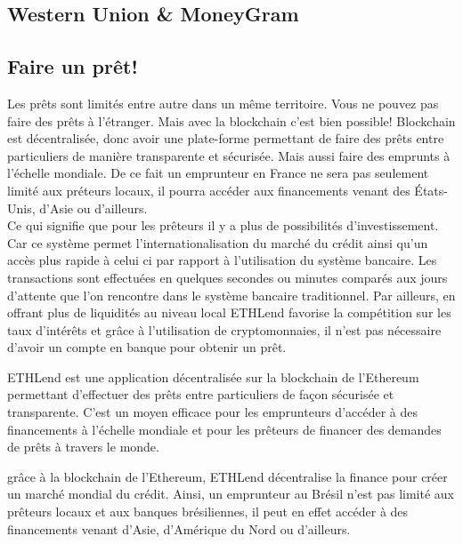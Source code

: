 \documentclass[12pt]{report}
\begin{document}

    \subsection{Western Union \& MoneyGram}


    \subsection{Faire un prêt! }
    
\hspace{1cm} Les prêts sont limités entre autre dans un même territoire. Vous ne pouvez pas faire des prêts à l'étranger. Mais avec la blockchain c'est bien possible! Blockchain  est décentralisée, donc avoir une plate-forme permettant de faire des prêts entre particuliers de manière transparente et sécurisée. Mais aussi faire des emprunts à l'échelle mondiale. De ce fait un emprunteur en France ne sera pas seulement limité aux préteurs locaux, il pourra accéder aux financements venant des États-Unis, d'Asie ou d'ailleurs. \\

\hspace{1cm} Ce qui signifie que pour les prêteurs il y a plus de possibilités d’investissement. Car ce système permet l’internationalisation du marché du crédit ainsi qu’un accès plus rapide à celui ci par rapport à l’utilisation du système bancaire. Les transactions sont effectuées en quelques secondes ou minutes comparés aux jours d’attente que l’on rencontre dans le système bancaire traditionnel.
Par ailleurs, en offrant plus de liquidités au niveau local ETHLend favorise la compétition sur les taux d’intérêts et grâce à l’utilisation de cryptomonnaies, il n’est pas nécessaire d’avoir un compte en banque pour obtenir un prêt.


ETHLend est une application décentralisée sur la blockchain de l’Ethereum permettant d’effectuer des prêts entre particuliers de façon sécurisée et transparente.
C’est un moyen efficace pour les emprunteurs d’accéder à des financements à l’échelle mondiale et pour les prêteurs de financer des demandes de prêts à travers le monde.

grâce à la blockchain de l’Ethereum, ETHLend décentralise la finance pour créer un marché mondial du crédit. Ainsi, un emprunteur au Brésil n’est pas limité aux prêteurs locaux et aux banques brésiliennes, il peut en effet accéder à des financements venant d’Asie, d’Amérique du Nord ou d’ailleurs.
\end{document}
